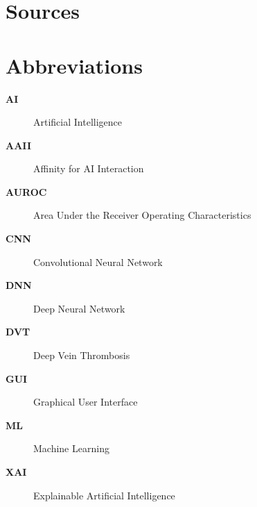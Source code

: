 {}
\listoffigures
\clearpage

{}
\listoftables
\clearpage

{}
\chapter*{Sources}

\printbibliography[heading=subbibintoc, nottype=online, nottype=software]

\printbibliography[heading=subbibintoc, type=online, title=Websites]

\printbibliography[heading=subbibintoc, type=software, title=Software]

\clearpage

{}
\chapter*{Abbreviations}
\begin{description}
    \item [\textbf{AI}] Artificial Intelligence
    \item [\textbf{AAII}] Affinity for AI Interaction
    \item [\textbf{AUROC}] Area Under the Receiver Operating Characteristics
    \item [\textbf{CNN}] Convolutional Neural Network
    \item [\textbf{DNN}] Deep Neural Network
    \item [\textbf{DVT}] Deep Vein Thrombosis
    \item [\textbf{GUI}] Graphical User Interface
    \item [\textbf{ML}] Machine Learning
    \item [\textbf{XAI}] Explainable Artificial Intelligence
\end{description}
\clearpage

{}
